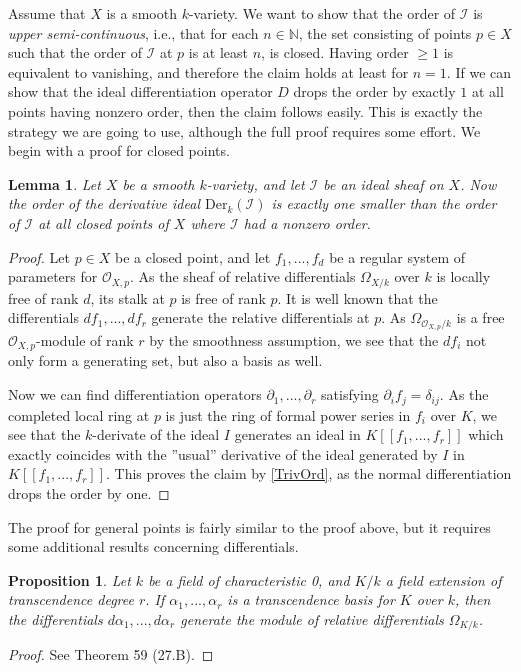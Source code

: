 \documentclass[12pt,a4paper,leqno]{article}
\newcommand{\N}{\mathbb{N}}
\newcommand{\OO}{\mathcal{O}}
\newcommand{\der}{\mathrm{Der}}
\newcommand{\fref}[1]{\hyperref[{#1}]{\ref*{#1}}}
\theoremstyle{plain}
\newtheorem{lem}[theo]{Lemma}
\newtheorem{prop}[theo]{Proposition}
\theoremstyle{definition}
\theoremstyle{remark}
\begin{document}
Assume that $X$ is a smooth $k$-variety. We want to show that the order of $\mathscr I$ is \emph{upper semi-continuous}, i.e., that for each $n \in \N$, the set consisting of points $p \in X$ such that the order of $\mathscr I$ at $p$ is at least $n$, is closed.  Having order $\geq 1$ is equivalent to vanishing, and therefore the claim holds at least for $n=1$. If we can show that the ideal differentiation operator $D$ drops the order by exactly $1$ at all points having nonzero order, then the claim follows easily. This is exactly the strategy we are going to use, although the full proof requires some effort. We begin with a proof for closed points.

\begin{lem}\label{derivativeAtClosedPoints}
Let $X$ be a smooth $k$-variety, and let $\mathscr{I}$ be an ideal sheaf on $X$. Now the order of the derivative ideal $\der_k (\mathscr{I})$ is exactly one smaller than the order of $\mathscr{I}$ at all closed points of $X$ where $\mathscr{I}$ had a nonzero order.
\end{lem}
\begin{proof}
Let $p \in X$ be a closed point, and  let $f_1,...,f_d$ be a regular system of parameters for $\OO_{X,p}$. As the sheaf of relative differentials $\Omega_{X/k}$ over $k$ is locally free of rank $d$, its stalk at $p$ is free of rank $p$. It is well known that the differentials $df_1, ..., df_r$ generate the relative differentials at $p$. As $\Omega_{\OO_{X,p}/k}$ is a free $\OO_{X,p}$-module of rank $r$ by the smoothness assumption, we see that the $df_i$ not only form a generating set, but also a basis as well.

Now we can find differentiation operators $\partial_1,...,\partial_r$ satisfying $\partial_i f_j = \delta_{ij}$. As the completed local ring at $p$ is just the ring of formal power series in $f_i$ over $K$, we see that the $k$-derivate of the ideal $I$ generates an ideal in $K [[f_1,...,f_r]]$ which exactly coincides with the ''usual'' derivative of the ideal generated by $I$ in $K [[f_1,...,f_r]]$. This proves the claim by \fref{TrivOrd}, as the normal differentiation drops the order by one.
\end{proof}

The proof for general points is fairly similar to the proof above, but it requires some additional results concerning differentials.

\begin{prop}
Let $k$ be a field of characteristic 0, and $K/k$ a field extension of transcendence degree $r$. If $\alpha_1, ..., \alpha_r$ is a transcendence basis for $K$ over $k$, then the differentials $d \alpha_1,...,d \alpha_r$ generate the module of relative differentials $\Omega_{K/k}$.
\end{prop}
\begin{proof}
See \cite{Ma} Theorem 59 (27.B).
\end{proof}
\end{document}
